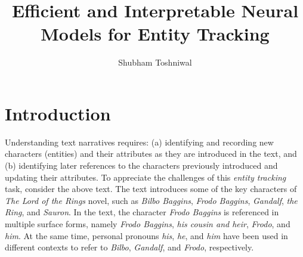 \documentclass[12pt]{thesis-umich}[thesis]
\title{\large{Efficient and Interpretable Neural Models for Entity Tracking}}
\author{Shubham Toshniwal}
\begin{document}
\chapter{Introduction}


\label{sec:intro}




\begin{figure}[h]

\end{figure} 
Understanding text narratives requires: 
(a) identifying and recording new characters (entities) and their attributes as they are introduced in the text, and (b) identifying later references to the characters previously introduced and updating their attributes.  
To appreciate the challenges of this \emph{entity tracking} task, consider the above text. 
The text introduces some of the key characters of \emph{The Lord of the Rings} novel, such as \emph{Bilbo Baggins}, \emph{Frodo Baggins}, \emph{Gandalf}, \emph{the Ring}, and \emph{Sauron}. In the text, the character \textit{Frodo Baggins} is referenced in multiple surface forms, namely \emph{Frodo Baggins}, \textit{his cousin and heir}, \textit{Frodo}, and \textit{him}.   
At the same time, personal pronouns \emph{his}, \emph{he}, and \emph{him} have been used in different contexts to refer to \emph{Bilbo}, \emph{Gandalf}, and \emph{Frodo}, respectively. 
\end{document}
